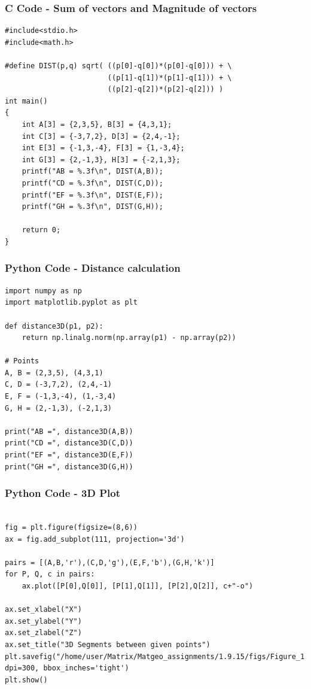 \documentclass{beamer}
\begin{document}
\begin{frame}[fragile]
    \frametitle{C Code - Sum of vectors and Magnitude of vectors}

    \begin{lstlisting}
#include<stdio.h>
#include<math.h>

#define DIST(p,q) sqrt( ((p[0]-q[0])*(p[0]-q[0])) + \
                        ((p[1]-q[1])*(p[1]-q[1])) + \
                        ((p[2]-q[2])*(p[2]-q[2])) )
int main()
{
    int A[3] = {2,3,5}, B[3] = {4,3,1};
    int C[3] = {-3,7,2}, D[3] = {2,4,-1};
    int E[3] = {-1,3,-4}, F[3] = {1,-3,4};
    int G[3] = {2,-1,3}, H[3] = {-2,1,3};
    printf("AB = %.3f\n", DIST(A,B));
    printf("CD = %.3f\n", DIST(C,D));
    printf("EF = %.3f\n", DIST(E,F));
    printf("GH = %.3f\n", DIST(G,H));

    return 0;
}

    \end{lstlisting}
\end{frame}

\begin{frame}[fragile]
\frametitle{Python Code - Distance calculation}
\begin{lstlisting}
import numpy as np
import matplotlib.pyplot as plt

def distance3D(p1, p2):
    return np.linalg.norm(np.array(p1) - np.array(p2))

# Points
A, B = (2,3,5), (4,3,1)
C, D = (-3,7,2), (2,4,-1)
E, F = (-1,3,-4), (1,-3,4)
G, H = (2,-1,3), (-2,1,3)

print("AB =", distance3D(A,B))
print("CD =", distance3D(C,D))
print("EF =", distance3D(E,F))
print("GH =", distance3D(G,H))
\end{lstlisting}
\end{frame}

\begin{frame}[fragile]
\frametitle{Python Code - 3D Plot}
\begin{lstlisting}

fig = plt.figure(figsize=(8,6))
ax = fig.add_subplot(111, projection='3d')

pairs = [(A,B,'r'),(C,D,'g'),(E,F,'b'),(G,H,'k')]
for P, Q, c in pairs:
    ax.plot([P[0],Q[0]], [P[1],Q[1]], [P[2],Q[2]], c+"-o")

ax.set_xlabel("X")
ax.set_ylabel("Y")
ax.set_zlabel("Z")
ax.set_title("3D Segments between given points")
plt.savefig("/home/user/Matrix/Matgeo_assignments/1.9.15/figs/Figure_1.png", dpi=300, bbox_inches='tight')
plt.show()

\end{lstlisting}
\end{frame}
\end{document}
